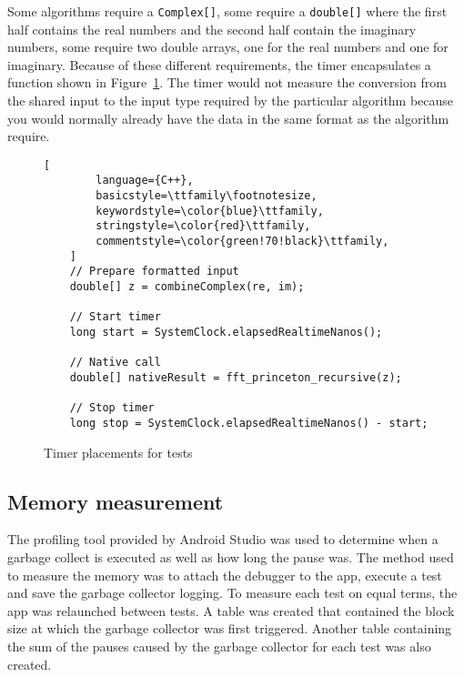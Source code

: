 Some algorithms require a \texttt{Complex[]}, some require a \texttt{double[]} where the first half contains the real numbers and the second half contain the imaginary numbers, some require two double arrays, one for the real numbers and one for imaginary. Because of these different requirements, the timer encapsulates a function shown in Figure~\ref{fig:timer:pos}. The timer would not measure the conversion from the shared input to the input type required by the particular algorithm because you would normally already have the data in the same format as the algorithm require.

\ifrelease
\begin{figure}
\begin{lstlisting}[
        language={C++},
        basicstyle=\ttfamily\footnotesize,
        keywordstyle=\color{blue}\ttfamily,
        stringstyle=\color{red}\ttfamily,
        commentstyle=\color{green!70!black}\ttfamily,
    ]
    // Prepare formatted input
    double[] z = combineComplex(re, im);

    // Start timer
    long start = SystemClock.elapsedRealtimeNanos();

    // Native call
    double[] nativeResult = fft_princeton_recursive(z);

    // Stop timer
    long stop = SystemClock.elapsedRealtimeNanos() - start;
\end{lstlisting}
\caption{Timer placements for tests}
\label{fig:timer:pos}
\end{figure}
\fi

\subsection{Memory measurement}
The profiling tool provided by Android Studio was used to determine when a garbage collect is executed as well as how long the pause was. The method used to measure the memory was to attach the debugger to the app, execute a test and save the garbage collector logging. To measure each test on equal terms, the app was relaunched between tests. A table was created that contained the block size at which the garbage collector was first triggered. Another table containing the sum of the pauses caused by the garbage collector for each test was also created.

